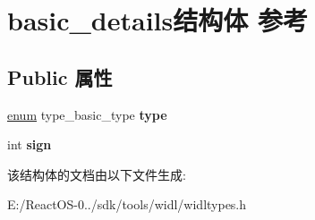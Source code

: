 \hypertarget{structbasic__details}{}\section{basic\+\_\+details结构体 参考}
\label{structbasic__details}
\subsection*{Public 属性}
\begin{DoxyCompactItemize}
\item 
\mbox{\label{structbasic__details_aa7488a50018105b4efc268df67910798}} 
\hyperlink{interfaceenum}{enum} type\+\_\+basic\+\_\+type {\bfseries type}
\item 
\mbox{\label{structbasic__details_a25943fde8bf77447618ed6bf48efd801}} 
int {\bfseries sign}
\end{DoxyCompactItemize}


该结构体的文档由以下文件生成\+:\begin{DoxyCompactItemize}
\item 
E\+:/\+React\+O\+S-\/0../sdk/tools/widl/widltypes.\+h\end{DoxyCompactItemize}
